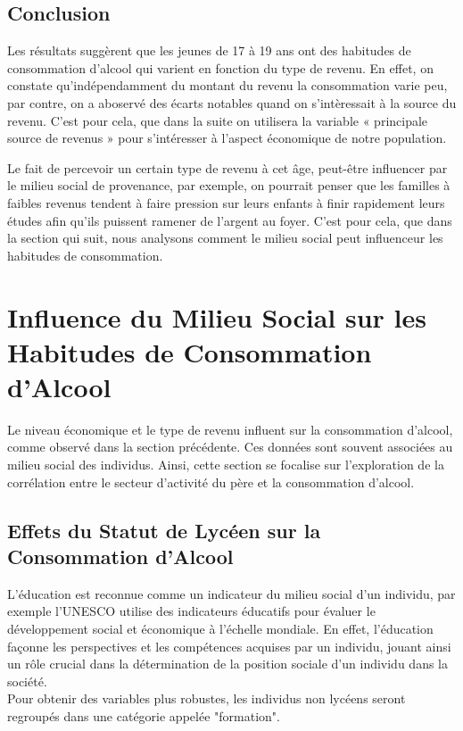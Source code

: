 \documentclass{article}
\begin{document}
\subsection{Conclusion}
Les résultats suggèrent que les jeunes de 17 à 19 ans ont des habitudes de consommation d'alcool qui varient en fonction du type de revenu. En effet, on constate qu'indépendamment du montant du revenu la consommation varie peu, par contre, on a aboservé des écarts notables quand on s'intèressait à la source du revenu. C'est pour cela, que dans la suite on utilisera la variable « principale source de revenus » pour s'intéresser à l'aspect économique de notre population. 

Le fait de percevoir un certain type de revenu à cet âge, peut-être influencer par le milieu social de provenance, par exemple, on pourrait penser que les familles à faibles revenus tendent à faire pression sur leurs enfants à finir rapidement leurs études afin qu'ils puissent ramener de l'argent au foyer. C'est pour cela, que dans la section qui suit, nous analysons comment le milieu social peut influenceur les habitudes de consommation.



\section{Influence du Milieu Social sur les Habitudes de Consommation d'Alcool }

Le niveau économique et le type de revenu influent sur la consommation d'alcool, comme observé dans la section précédente. Ces données sont souvent associées au milieu social des individus. Ainsi, cette section se focalise sur l'exploration de la corrélation entre le secteur d'activité du père et la consommation d'alcool.
\subsection{Effets du Statut de Lycéen sur la Consommation d'Alcool}
L'éducation est reconnue comme un indicateur du milieu social d'un individu, par exemple l'UNESCO utilise des indicateurs éducatifs pour évaluer le développement social et économique à l'échelle mondiale. En effet, l'éducation façonne les perspectives et les compétences acquises par un individu, jouant ainsi un rôle crucial dans la détermination de la position sociale d'un individu dans la société. \\
Pour obtenir des variables plus robustes, les individus non lycéens seront regroupés dans une catégorie appelée "formation".
\end{document}
